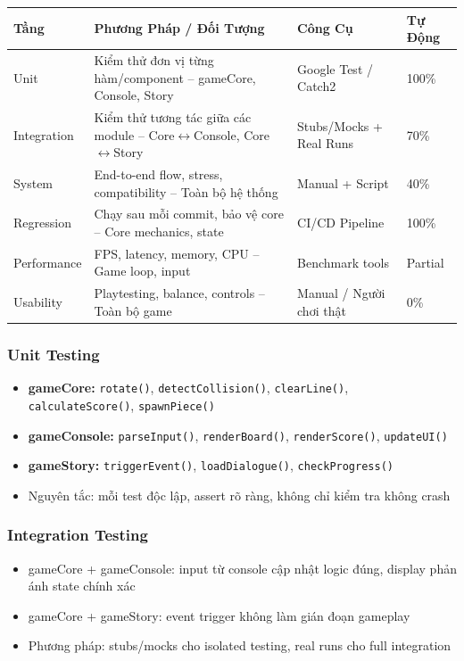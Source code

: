 \documentclass[12pt,a4paper]{article}
\begin{document}
\begin{table}[H]
\centering
{}
\begin{tabularx}{\linewidth}{|l|X|X|X|}
\hline
\rowcolor{gray!35}
\textbf{Tầng} & \textbf{Phương Pháp / Đối Tượng} & \textbf{Công Cụ} & \textbf{Tự Động} \\ \hline
Unit        & Kiểm thử đơn vị từng hàm/component – gameCore, Console, Story             & Google Test / Catch2     & 100\%   \\ \hline
Integration & Kiểm thử tương tác giữa các module – Core$\leftrightarrow$Console, Core$\leftrightarrow$Story & Stubs/Mocks + Real Runs  & 70\%    \\ \hline
System      & End-to-end flow, stress, compatibility – Toàn bộ hệ thống                 & Manual + Script          & 40\%    \\ \hline
Regression  & Chạy sau mỗi commit, bảo vệ core – Core mechanics, state                  & CI/CD Pipeline           & 100\%   \\ \hline
Performance & FPS, latency, memory, CPU – Game loop, input                              & Benchmark tools          & Partial \\ \hline
Usability   & Playtesting, balance, controls – Toàn bộ game                             & Manual / Người chơi thật & 0\%     \\ \hline
\end{tabularx}
\end{table}

\subsubsection{Unit Testing}
\begin{itemize}[leftmargin=3em]
  \item \textbf{gameCore:} \texttt{rotate()}, \texttt{detectCollision()}, \texttt{clearLine()}, \texttt{calculateScore()}, \texttt{spawnPiece()}
  \item \textbf{gameConsole:} \texttt{parseInput()}, \texttt{renderBoard()}, \texttt{renderScore()}, \texttt{updateUI()}
  \item \textbf{gameStory:} \texttt{triggerEvent()}, \texttt{loadDialogue()}, \texttt{checkProgress()}
  \item Nguyên tắc: mỗi test độc lập, assert rõ ràng, không chỉ kiểm tra không crash
\end{itemize}

\subsubsection{Integration Testing}
\begin{itemize}[leftmargin=3em]
  \item gameCore + gameConsole: input từ console cập nhật logic đúng, display phản ánh state chính xác
  \item gameCore + gameStory: event trigger không làm gián đoạn gameplay
  \item Phương pháp: stubs/mocks cho isolated testing, real runs cho full integration
\end{itemize}
\end{document}
